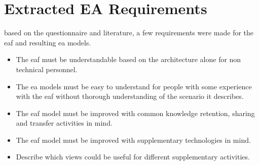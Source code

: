 \section{Extracted EA Requirements}
based on the questionnaire and literature, a few requirements were made for the \gls{eaf} and resulting \gls{ea} models.

\begin{itemize}
    \item The \gls{eaf} must be understandable based on the architecture alone for non technical personnel.
    \item The \gls{ea} models must be easy to understand for people with some experience with the \gls{eaf} without thorough understanding of the scenario it describes.
    \item The \gls{eaf} model must be improved with common knowledge retention, sharing and transfer activities in mind.
    \item The \gls{eaf} model must be improved with supplementary technologies in mind. 
    \item Describe which views could be useful for different supplementary activities.
\end{itemize}
